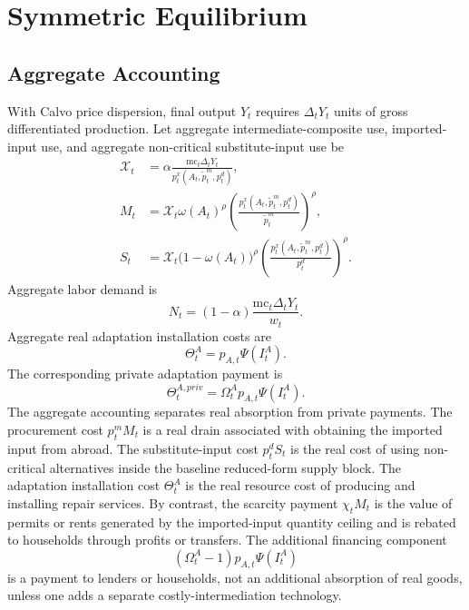 ﻿\documentclass[12pt]{article}
\theoremstyle{remark}
\newcommand{\mc}{\mathrm{mc}}
\begin{document}
\section{Symmetric Equilibrium}

\subsection{Aggregate Accounting}

With Calvo price dispersion, final output $Y_t$ requires $\Delta_tY_t$ units of gross
differentiated production. Let aggregate intermediate-composite use, imported-input use, and
aggregate non-critical substitute-input use be
\begin{align}
    \mathcal X_t
    &=
    \alpha\frac{\mc_t\Delta_tY_t}{p_t^x(A_t,\tilde p_t^m,p_t^d)},
    \label{eq:aggregate_x_calvo}\\
    M_t
    &=
    \mathcal X_t
    \omega(A_t)^\rho
    \left(
        \frac{p_t^x(A_t,\tilde p_t^m,p_t^d)}{\tilde p_t^m}
    \right)^\rho,
    \label{eq:aggregate_M_calvo}\\
    S_t
    &=
    \mathcal X_t
    \bigl(1-\omega(A_t)\bigr)^\rho
    \left(
        \frac{p_t^x(A_t,\tilde p_t^m,p_t^d)}{p_t^d}
    \right)^\rho.
    \label{eq:aggregate_S_calvo}
\end{align}
Aggregate labor demand is
\begin{equation}
    N_t
    =
    (1-\alpha)\frac{\mc_t\Delta_tY_t}{w_t}.
    \label{eq:aggregate_N_calvo}
\end{equation}
Aggregate real adaptation installation costs are
\begin{equation}
    \Theta_t^A
    =
    p_{A,t}\Psi(I_t^A).
    \label{eq:aggregate_adaptation_cost}
\end{equation}
The corresponding private adaptation payment is
\begin{equation}
    \Theta_t^{A,priv}
    =
    \Omega_t^A p_{A,t}\Psi(I_t^A).
    \label{eq:private_adaptation_cost}
\end{equation}
The aggregate accounting separates real absorption from private payments. The procurement cost
$p_t^mM_t$ is a real drain associated with obtaining the imported input from abroad. The
substitute-input cost $p_t^dS_t$ is the real cost of using non-critical alternatives inside the
baseline reduced-form supply block. The adaptation installation cost $\Theta_t^A$ is the real
resource cost of producing and installing repair services. By contrast, the scarcity payment
$\chi_tM_t$ is the value of permits or rents generated by the imported-input quantity ceiling and
is rebated to households through profits or transfers. The additional financing component
\[
    (\Omega_t^A-1)p_{A,t}\Psi(I_t^A)
\]
is a payment to lenders or households, not an additional absorption of real goods, unless one adds
a separate costly-intermediation technology.
\end{document}
